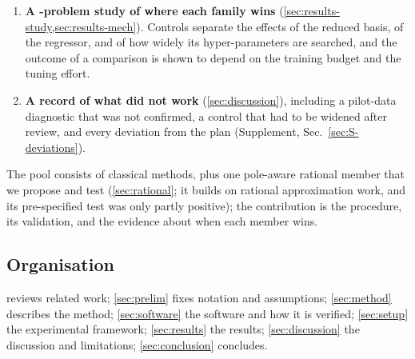 \begin{enumerate}
\item \textbf{A \NAllProblems-problem study of where each family wins} (\cref{sec:results-study,sec:results-mech}). Controls separate the effects of the reduced basis, of the regressor, and of how widely its hyper-parameters are searched, and the outcome of a comparison is shown to depend on the training budget and the tuning effort.
\item \textbf{A record of what did not work} (\cref{sec:discussion}), including a pilot-data diagnostic that was not confirmed, a control that had to be widened after review, and every deviation from the plan (Supplement, Sec.~\ref{sec:S-deviations}).
\end{enumerate}
The pool consists of classical methods, plus one pole-aware rational member that we propose and test (\cref{sec:rational}; it builds on rational approximation work, and its pre-specified test was only partly positive); the contribution is the procedure, its validation, and the evidence about when each member wins.

\subsection*{Organisation}
 reviews related work; \cref{sec:prelim} fixes notation and assumptions; \cref{sec:method} describes the method; \cref{sec:software} the software and how it is verified; \cref{sec:setup} the experimental framework; \cref{sec:results} the results; \cref{sec:discussion} the discussion and limitations; \cref{sec:conclusion} concludes.
